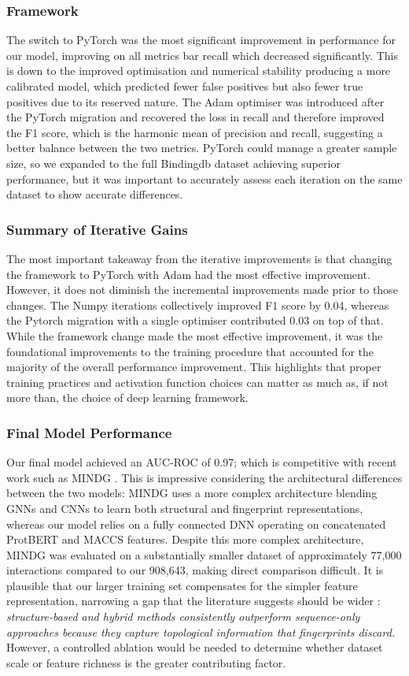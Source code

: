 \subsubsection{Framework}
The switch to PyTorch was the most significant improvement in performance for our model, improving on all metrics bar recall which decreased significantly.
This is down to the improved optimisation and numerical stability producing a more calibrated model, which predicted fewer false positives but also fewer true positives due to its reserved nature.
The Adam optimiser was introduced after the PyTorch migration and recovered the loss in recall and therefore improved the F1 score, which is the harmonic mean of precision and recall, suggesting a better balance between the two metrics.
PyTorch could manage a greater sample size, so we expanded to the full Bindingdb dataset achieving superior performance, but it was important to accurately assess each iteration on the same dataset to show accurate differences.
\subsubsection{Summary of Iterative Gains}
The most important takeaway from the iterative improvements is that changing the framework to PyTorch with Adam had the most effective improvement.
However, it does not diminish the incremental improvements made prior to those changes.
The Numpy iterations collectively improved F1 score by 0.04, whereas the Pytorch migration with a single optimiser contributed 0.03 on top of that.
While the framework change made the most effective improvement, it was the foundational improvements to the training procedure that accounted for the majority of the overall performance improvement.
This highlights that proper training practices and activation function choices can matter as much as, if not more than, the choice of deep learning framework.
\subsubsection{Final Model Performance}
Our final model achieved an AUC-ROC of 0.97; which is competitive with recent work such as MINDG \citep{Yang2024}.
This is impressive considering the architectural differences between the two models: MINDG uses a more complex architecture blending GNNs and CNNs to learn both structural and fingerprint representations, whereas our model relies on a fully connected DNN operating on concatenated ProtBERT and MACCS features.
Despite this more complex architecture, MINDG was evaluated on a substantially smaller dataset of approximately 77,000 interactions compared to our 908,643, making direct comparison difficult.
It is plausible that our larger training set compensates for the simpler feature representation, narrowing a gap that the literature suggests should be wider \citep{Vefghi2025}: \textit{structure-based and hybrid methods consistently outperform sequence-only approaches because they capture topological information that fingerprints discard.}
However, a controlled ablation would be needed to determine whether dataset scale or feature richness is the greater contributing factor.
